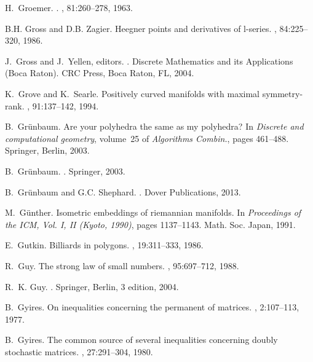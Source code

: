 \documentclass[12pt]{amsart}
\begin{document}
\begin{thebibliography}{100}
H.~Groemer.
.
, 81:260--278, 1963.

B.H. Gross and D.B. Zagier.
\newblock Heegner points and derivatives of l-series.
, 84:225--320, 1986.

J.~Gross and J.~Yellen, editors.
.
\newblock Discrete Mathematics and its Applications (Boca Raton). CRC Press,
  Boca Raton, FL, 2004.

K.~Grove and K.~Searle.
\newblock Positively curved manifolds with maximal symmetry-rank.
, 91:137--142, 1994.

B.~Gr{\"u}nbaum.
\newblock Are your polyhedra the same as my polyhedra?
\newblock In {\em Discrete and computational geometry}, volume~25 of {\em
  Algorithms Combin.}, pages 461--488. Springer, Berlin, 2003.

B.~Gr\"unbaum.
.
\newblock Springer, 2003.

B.~Gr{\"u}nbaum and G.C. Shephard.
.
\newblock Dover Publications, 2013.

M.~{G\"u}nther.
\newblock Isometric embeddings of riemannian manifolds.
\newblock In {\em Proceedings of the ICM, Vol. I, II (Kyoto, 1990)}, pages
  1137--1143. Math. Soc. Japan, 1991.

E.~Gutkin.
\newblock Billiards in polygons.
, 19:311--333, 1986.

R.~Guy.
\newblock The strong law of small numbers.
, 95:697--712, 1988.

R.~K. Guy.
.
\newblock Springer, Berlin, 3 edition, 2004.

B.~Gyires.
\newblock On inequalities concerning the permanent of matrices.
, 2:107--113, 1977.

B.~Gyires.
\newblock The common source of several inequalities concerning doubly
  stochastic matrices.
, 27:291--304, 1980.


\end{thebibliography}
\end{document}
